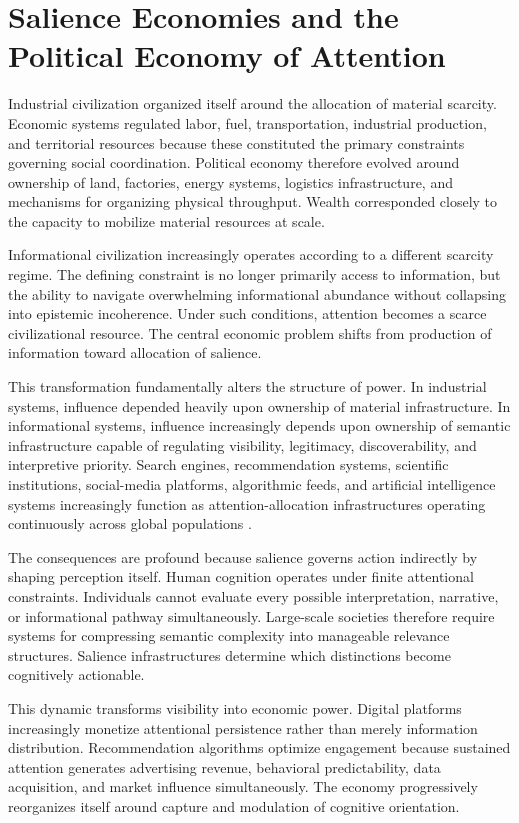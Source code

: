 \documentclass[11pt,a4paper]{article}
\begin{document}
\section{Salience Economies and the Political Economy of Attention}

Industrial civilization organized itself around the allocation of material scarcity. Economic systems regulated labor, fuel, transportation, industrial production, and territorial resources because these constituted the primary constraints governing social coordination. Political economy therefore evolved around ownership of land, factories, energy systems, logistics infrastructure, and mechanisms for organizing physical throughput. Wealth corresponded closely to the capacity to mobilize material resources at scale.

Informational civilization increasingly operates according to a different scarcity regime. The defining constraint is no longer primarily access to information, but the ability to navigate overwhelming informational abundance without collapsing into epistemic incoherence. Under such conditions, attention becomes a scarce civilizational resource. The central economic problem shifts from production of information toward allocation of salience.

This transformation fundamentally alters the structure of power. In industrial systems, influence depended heavily upon ownership of material infrastructure. In informational systems, influence increasingly depends upon ownership of semantic infrastructure capable of regulating visibility, legitimacy, discoverability, and interpretive priority. Search engines, recommendation systems, scientific institutions, social-media platforms, algorithmic feeds, and artificial intelligence systems increasingly function as attention-allocation infrastructures operating continuously across global populations \cite{zuboff2019}.

The consequences are profound because salience governs action indirectly by shaping perception itself. Human cognition operates under finite attentional constraints. Individuals cannot evaluate every possible interpretation, narrative, or informational pathway simultaneously. Large-scale societies therefore require systems for compressing semantic complexity into manageable relevance structures. Salience infrastructures determine which distinctions become cognitively actionable.

This dynamic transforms visibility into economic power. Digital platforms increasingly monetize attentional persistence rather than merely information distribution. Recommendation algorithms optimize engagement because sustained attention generates advertising revenue, behavioral predictability, data acquisition, and market influence simultaneously. The economy progressively reorganizes itself around capture and modulation of cognitive orientation.
\end{document}
